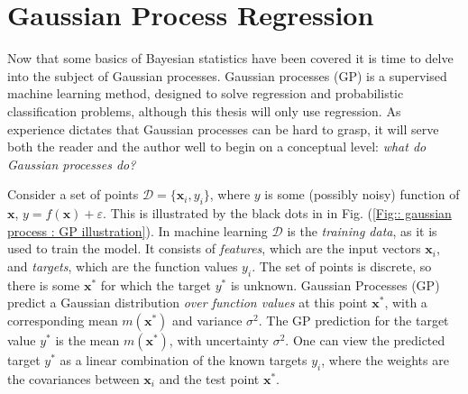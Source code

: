 \documentclass[twoside,english]{uiofysmaster}
\begin{document}
\section{Gaussian Process Regression}

Now that some basics of Bayesian statistics have been covered it is time to delve into the subject of Gaussian processes. Gaussian processes (GP) is a supervised machine learning method, designed to solve regression and probabilistic classification problems, although this thesis will only use regression. As experience dictates that Gaussian processes can be hard to grasp, it will serve both the reader and the author well to begin on a conceptual level: \textit{what do Gaussian processes do?}

Consider a set of points $\mathcal{D} = \{\textbf{x}_i, y_i\}$, where $y$ is some (possibly noisy) function of $\textbf{x}$, $y = f(\textbf{x}) + \varepsilon$. This is illustrated by the black dots in in Fig. (\ref{Fig:: gaussian process : GP illustration}). In machine learning $\mathcal{D}$ is the \textit{training data}, as it is used to train the model. It consists of \textit{features}, which are the input vectors $\textbf{x}_i$, and \textit{targets}, which are the function values $y_i$. The set of points is discrete, so there is some $\textbf{x}^*$ for which the target $y^*$ is unknown. Gaussian Processes (GP) predict a Gaussian distribution \textit{over function values} at this point $\textbf{x}^*$, with a corresponding mean $m(\textbf{x}^*)$ and variance $\sigma^2$. The GP prediction for the target value $y^*$ is the mean $m(\textbf{x}^*)$, with uncertainty $\sigma^2$. One can view the predicted target $y^*$ as a linear combination of the known targets $y_i$, where the weights are the covariances between $\textbf{x}_i$ and the test point $\textbf{x}^*$.  
\end{document}
